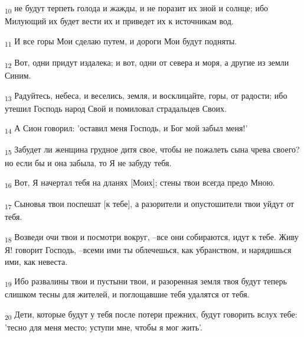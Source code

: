 \begin{tcolorbox}
\textsubscript{10} не будут терпеть голода и жажды, и не поразит их зной и солнце; ибо Милующий их будет вести их и приведет их к источникам вод.
\end{tcolorbox}
\begin{tcolorbox}
\textsubscript{11} И все горы Мои сделаю путем, и дороги Мои будут подняты.
\end{tcolorbox}
\begin{tcolorbox}
\textsubscript{12} Вот, одни придут издалека; и вот, одни от севера и моря, а другие из земли Синим.
\end{tcolorbox}
\begin{tcolorbox}
\textsubscript{13} Радуйтесь, небеса, и веселись, земля, и восклицайте, горы, от радости; ибо утешил Господь народ Свой и помиловал страдальцев Своих.
\end{tcolorbox}
\begin{tcolorbox}
\textsubscript{14} А Сион говорил: 'оставил меня Господь, и Бог мой забыл меня!'
\end{tcolorbox}
\begin{tcolorbox}
\textsubscript{15} Забудет ли женщина грудное дитя свое, чтобы не пожалеть сына чрева своего? но если бы и она забыла, то Я не забуду тебя.
\end{tcolorbox}
\begin{tcolorbox}
\textsubscript{16} Вот, Я начертал тебя на дланях [Моих]; стены твои всегда предо Мною.
\end{tcolorbox}
\begin{tcolorbox}
\textsubscript{17} Сыновья твои поспешат [к тебе], а разорители и опустошители твои уйдут от тебя.
\end{tcolorbox}
\begin{tcolorbox}
\textsubscript{18} Возведи очи твои и посмотри вокруг, --все они собираются, идут к тебе. Живу Я! говорит Господь, --всеми ими ты облечешься, как убранством, и нарядишься ими, как невеста.
\end{tcolorbox}
\begin{tcolorbox}
\textsubscript{19} Ибо развалины твои и пустыни твои, и разоренная земля твоя будут теперь слишком тесны для жителей, и поглощавшие тебя удалятся от тебя.
\end{tcolorbox}
\begin{tcolorbox}
\textsubscript{20} Дети, которые будут у тебя после потери прежних, будут говорить вслух тебе: 'тесно для меня место; уступи мне, чтобы я мог жить'.
\end{tcolorbox}
